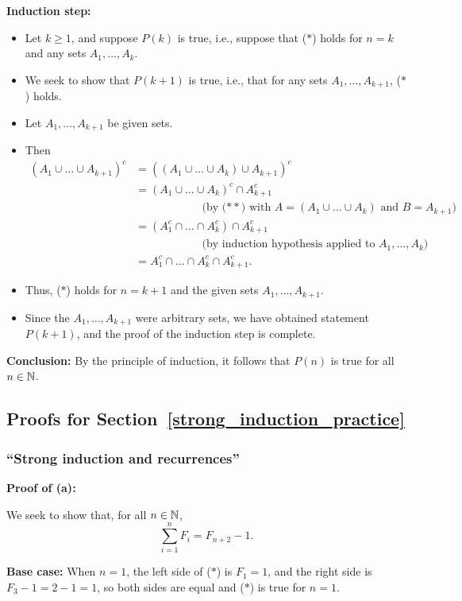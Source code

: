 \textbf{Induction step:} 
\begin{itemize}
\item Let $k\ge 1$, and suppose $P(k)$ is true, i.e.,
suppose that ($*$) holds for $n=k$ and any sets $A_1,\dots,A_k$.
\item
We seek to show that $P(k+1)$ is true, i.e., that for
any sets $A_1,\dots,A_{k+1}$, ($*$) holds. 
\item
Let $A_1,\dots,A_{k+1}$  be given sets.
\item
Then
\begin{align*}
\left(A_1\cup \dots \cup A_{k+1}\right)^c
&=\left(\left(A_1\cup \dots \cup A_{k}\right)\cup A_{k+1}\right)^c
\\
&=\left(A_1\cup \dots \cup A_{k}\right)^c\cap A_{k+1}^c
\quad\\
& \qquad \qquad\qquad \text{(by ($**$) with $A=(A_1\cup \dots \cup A_k)$ and 
$B=A_{k+1}$)}
\\
&=\left(A_1^c\cap\dots \cap A_k^c\right)\cap A_{k+1}^c\\
& \qquad \qquad\qquad \text{(by induction hypothesis applied to $A_1,\dots, A_k$)}
\\
&=A_1^c\cap\dots \cap A_k^c\cap A_{k+1}^c.
\end{align*}
\item
Thus, ($*$) holds for $n=k+1$
and the given sets $A_1,\dots,A_{k+1}$.
\item 
Since the $A_1,\dots,A_{k+1}$ were
arbitrary sets, we have obtained statement $P(k+1)$, and the 
proof of the induction step is complete.
\end{itemize}

\textbf{Conclusion:} By the principle of induction, 
it follows that $P(n)$ is true for all $n\in\mathbb{N}$.  
 

\subsection{Proofs for Section~\ref{strong_induction_practice}}
\subsubsection{``Strong induction and recurrences''}

\noindent
\textbf{Proof of (a):}

We seek to show that, for all $n\in\mathbb{N}$, 
\[
\tag{$*$}
\sum_{i=1}^n F_i=F_{n+2}-1.
\]

\textbf{Base case:} When $n=1$, the left side of ($*$) is $F_1 =1$,
and the
right side is $F_3-1=2-1=1$, so both sides are equal and ($*$) is
true for $n=1$.


